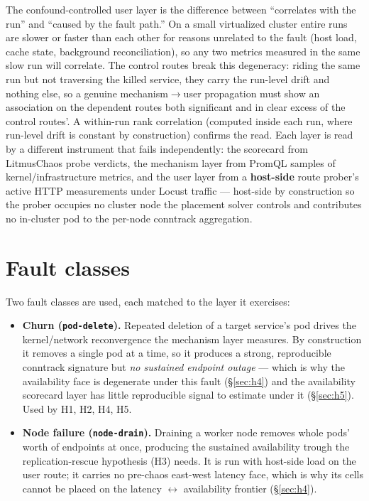 The confound-controlled user layer is the difference between ``correlates with
the run'' and ``caused by the fault path.'' On a small virtualized cluster
entire runs are slower or faster than each other for reasons unrelated to the
fault (host load, cache state, background reconciliation), so any two metrics
measured in the same slow run will correlate. The control routes break this
degeneracy: riding the same run but not traversing the killed service, they
carry the run-level drift and nothing else, so a genuine mechanism$\rightarrow$user
propagation must show an association on the dependent routes both significant
and in clear excess of the control routes'. A within-run rank correlation
(computed inside each run, where run-level drift is constant by construction)
confirms the read. Each layer is read by a different instrument that fails
independently: the scorecard from LitmusChaos probe verdicts, the mechanism
layer from PromQL samples of kernel/infrastructure metrics, and the user layer
from a \textbf{host-side} route prober's active HTTP measurements under Locust
traffic --- host-side by construction so the prober occupies no cluster node the
placement solver controls and contributes no in-cluster pod to the per-node
conntrack aggregation.

\section{Fault classes}\label{sec:fault-classes}

Two fault classes are used, each matched to the layer it exercises:

\begin{itemize}
\item \textbf{Churn (\texttt{pod-delete}).} Repeated deletion of a target
  service's pod drives the kernel/network reconvergence the mechanism layer
  measures. By construction it removes a single pod at a time, so it produces a
  strong, reproducible conntrack signature but \emph{no sustained endpoint
  outage} --- which is why the availability face is degenerate under this fault
  (\S\ref{sec:h4}) and the availability scorecard layer has little reproducible
  signal to estimate under it (\S\ref{sec:h5}). Used by H1, H2, H4, H5.
\item \textbf{Node failure (\texttt{node-drain}).} Draining a worker node
  removes whole pods' worth of endpoints at once, producing the sustained
  availability trough the replication-rescue hypothesis (H3) needs. It is run
  with host-side load on the user route; it carries no pre-chaos east-west
  latency face, which is why its cells cannot be placed on the latency
  $\leftrightarrow$ availability frontier (\S\ref{sec:h4}).
\end{itemize}

